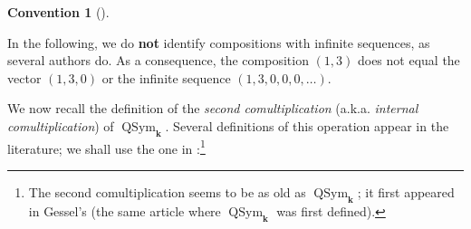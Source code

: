 \documentclass[numbers=enddot,12pt,final,onecolumn,notitlepage,abstracton]{scrartcl}%
\theoremstyle{definition}
\newtheorem{conv}[theo]{Convention}
\newenvironment{convention}[1][]
{\begin{conv}[#1]\begin{leftbar}}
{\end{leftbar}\end{conv}}
\begin{document}
\begin{convention}
In the following, we do \textbf{not} identify compositions with infinite
sequences, as several authors do. As a consequence, the composition $\left(
1,3\right)  $ does not equal the vector $\left(  1,3,0\right)  $ or the
infinite sequence $\left(  1,3,0,0,0,\ldots\right)  $.
\end{convention}

We now recall the definition of the \textit{second comultiplication} (a.k.a.
\textit{internal comultiplication}) of $\operatorname*{QSym}%
\nolimits_{\mathbf{k}}$. Several definitions of this operation appear in the
literature; we shall use the one in \cite[\S 11.39]{HazeWitt}:\footnote{The
second comultiplication seems to be as old as $\operatorname*{QSym}%
\nolimits_{\mathbf{k}}$; it first appeared in Gessel's \cite[\S 4]{Gessel}
(the same article where $\operatorname*{QSym}\nolimits_{\mathbf{k}}$ was first
defined).}
\end{document}
